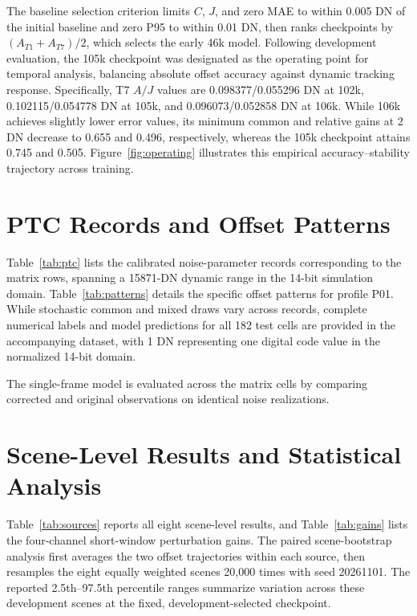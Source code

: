 The baseline selection criterion limits $C$, $J$, and zero MAE to within 0.005 DN of the initial baseline and zero P95 to within 0.01 DN, then ranks checkpoints by $(A_{T1}+A_{T7})/2$, which selects the early 46k model. Following development evaluation, the 105k checkpoint was designated as the operating point for temporal analysis, balancing absolute offset accuracy against dynamic tracking response. Specifically, T7 $A/J$ values are 0.098377/0.055296 DN at 102k, 0.102115/0.054778 DN at 105k, and 0.096073/0.052858 DN at 106k. While 106k achieves slightly lower error values, its minimum common and relative gains at 2 DN decrease to 0.655 and 0.496, respectively, whereas the 105k checkpoint attains 0.745 and 0.505. Figure~\ref{fig:operating} illustrates this empirical accuracy--stability trajectory across training.

\section{PTC Records and Offset Patterns}
\label{app:ptc}


Table~\ref{tab:ptc} lists the calibrated noise-parameter records corresponding to the matrix rows, spanning a 15871-DN dynamic range in the 14-bit simulation domain. Table~\ref{tab:patterns} details the specific offset patterns for profile P01. While stochastic common and mixed draws vary across records, complete numerical labels and model predictions for all 182 test cells are provided in the accompanying dataset, with 1 DN representing one digital code value in the normalized 14-bit domain.

The single-frame model is evaluated across the matrix cells by comparing corrected and original observations on identical noise realizations.

\section{Scene-Level Results and Statistical Analysis}
\label{app:statistics}



Table~\ref{tab:sources} reports all eight scene-level results, and Table~\ref{tab:gains} lists the four-channel short-window perturbation gains. The paired scene-bootstrap analysis first averages the two offset trajectories within each source, then resamples the eight equally weighted scenes 20,000 times with seed 20261101. The reported 2.5th--97.5th percentile ranges summarize variation across these development scenes at the fixed, development-selected checkpoint.

